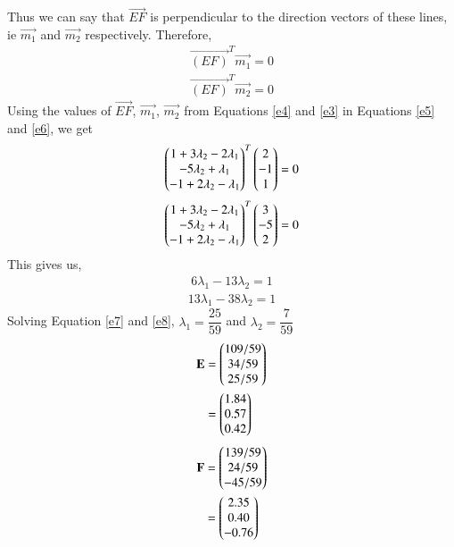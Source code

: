 \documentclass[journal,12pt,twocolumn]{IEEEtran}
\begin{document}
Thus we can say that $\vec{EF}$ is perpendicular to the direction vectors of these lines, ie $\vec{m_1}$ and $\vec{m_2}$ respectively. Therefore,
\begin{align}\label{e5}
    \vec{(EF)}^T \vec{m_1} = 0
\end{align}
\begin{align}\label{e6}
    \vec{(EF)}^T \vec{m_2} = 0
\end{align}
Using the values of $\vec{EF}$, $\vec{m_1}$, $\vec{m_2}$ from Equations \ref{e4} and \ref{e3} in Equations \ref{e5} and \ref{e6}, we get
\begin{align}
    \begin{pmatrix} 1 + 3\lambda_2 -2\lambda_1 \\ -5\lambda_2 + \lambda_1 \\ -1 + 2\lambda_2 - \lambda_1\end{pmatrix}^T\begin{pmatrix}2 \\ -1 \\ 1\end{pmatrix} = 0
\end{align}
\begin{align}
    \begin{pmatrix} 1 + 3\lambda_2 -2\lambda_1 \\ -5\lambda_2 + \lambda_1 \\ -1 + 2\lambda_2 - \lambda_1\end{pmatrix}^T\begin{pmatrix}3 \\ -5 \\ 2\end{pmatrix} = 0
\end{align}
This gives us,
\begin{align}\label{e7}
    6\lambda_1 -13\lambda_2 = 1
\end{align}
\begin{align}\label{e8}
   13\lambda_1 -38\lambda_2 = 1
\end{align}
Solving Equation \ref{e7} and \ref{e8}, $\lambda_1 = \dfrac{25}{59}$ and $\lambda_2 = \dfrac{7}{59}$\\
\begin{align}
    \mathbf{E} & = \begin{pmatrix}109/59 \\ 34/59
    \\ 25/59\end{pmatrix}
    \\&=\begin{pmatrix}1.84 \\ 0.57 \\ 0.42\end{pmatrix}
\end{align}
\begin{align}
    \mathbf{F} & = \begin{pmatrix}139/59 \\ 24/59
    \\ -45/59\end{pmatrix}
    \\&=\begin{pmatrix}2.35 \\ 0.40 \\ -0.76\end{pmatrix}
\end{align}
\end{document}
